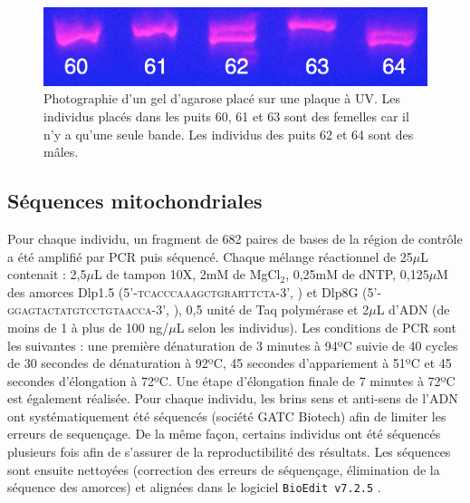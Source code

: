\documentclass[a4paper,12pt,twoside]{article}\usepackage[]{graphicx}\usepackage[]{color}
\begin{document}
\begin {bibunit} [newbst]
\begin{figure}[htbp]
	\centering
		\includegraphics[width=.7\textwidth]{photo}
	\caption[Photographie d'un gel d'agarose placé sur une plaque à UV]{Photographie d'un gel d'agarose placé sur une plaque à UV. Les individus placés dans les puits 60, 61 et 63 sont des femelles car il n'y a qu'une seule bande. Les individus des puits 62 et 64 sont des mâles.}
	\label{fig:photo}
\end{figure}


\subsection{Séquences mitochondriales}

Pour chaque individu, un fragment de 682 paires de bases de la région de contrôle a été amplifié par PCR puis séquencé. Chaque mélange réactionnel de 25$\mu$L contenait : 2,5$\mu$L de tampon 10X, 2mM de MgCl$_2$, 0,25mM de dNTP, 0,125$\mu$M des amorces Dlp1.5 (5'-\textsc{tcacccaaagctgrarttcta}-3', \citealt{baker1998}) et Dlp8G (5'-\textsc{ggagtactatgtcctgtaacca}-3', \citealt{dalebout2005}), 0,5 unité de Taq polymérase et 2$\mu$L d'ADN (de moins de 1 à plus de 100 ng/$\mu$L selon les individus). Les conditions de PCR sont les suivantes : une première dénaturation de 3 minutes à 94ºC suivie de 40 cycles de 30 secondes de dénaturation à 92ºC, 45 secondes d'appariement à 51ºC et 45 secondes d'élongation à 72ºC. Une étape d'élongation finale de 7 minutes à 72ºC est également réalisée. Pour chaque individu, les brins sens et anti-sens de l'ADN ont systématiquement été séquencés (société GATC Biotech) afin de limiter les erreurs de sequençage. De la même façon, certains individus ont été séquencés plusieurs fois afin de s'assurer de la reproductibilité des résultats. Les séquences sont ensuite nettoyées (correction des erreurs de séquençage, élimination de la séquence des amorces) et alignées dans le logiciel \texttt{BioEdit}\texttrademark~\texttt{v7.2.5} \citep{hall1999}.



\end{bibunit}
\end{document}
